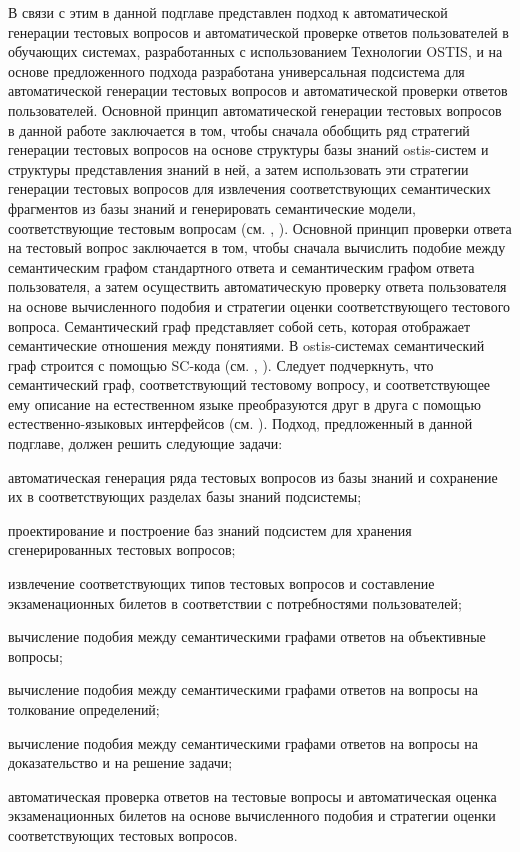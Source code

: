 В связи с этим в данной подглаве представлен подход к автоматической генерации тестовых вопросов и автоматической проверке ответов пользователей в обучающих системах, разработанных с использованием Технологии OSTIS, и на основе предложенного подхода разработана универсальная подсистема для автоматической генерации тестовых вопросов и автоматической проверки ответов пользователей. Основной принцип автоматической генерации тестовых вопросов в данной работе заключается в том, чтобы сначала обобщить ряд стратегий генерации тестовых вопросов на основе структуры базы знаний ostis-систем и структуры представления знаний в ней, а затем использовать эти стратегии генерации тестовых вопросов для извлечения соответствующих семантических фрагментов из базы знаний и генерировать семантические модели, соответствующие тестовым вопросам (см. , ). Основной принцип проверки ответа на тестовый вопрос заключается в том, чтобы сначала вычислить подобие между семантическим графом стандартного ответа и семантическим графом ответа пользователя, а затем осуществить автоматическую проверку ответа пользователя на основе вычисленного подобия и стратегии оценки соответствующего тестового вопроса. Семантический граф представляет собой сеть, которая отображает семантические отношения между понятиями. В ostis-системах семантический граф строится с помощью SC-кода (см. , ). Следует подчеркнуть, что семантический граф, соответствующий тестовому вопросу, и соответствующее ему описание на естественном языке преобразуются друг в друга с помощью естественно-языковых интерфейсов (см. ). Подход, предложенный в данной подглаве, должен решить следующие задачи:

\begin{textitemize}
	\item автоматическая генерация ряда тестовых вопросов из базы знаний и сохранение их в соответствующих разделах базы знаний подсистемы;
	\item проектирование и построение баз знаний подсистем для хранения сгенерированных тестовых вопросов;
	\item извлечение соответствующих типов тестовых вопросов и составление экзаменационных билетов в соответствии с потребностями пользователей;
	\item вычисление подобия между семантическими графами ответов на объективные вопросы;
	\item вычисление подобия между семантическими графами ответов на вопросы на толкование определений;
	\item вычисление подобия между семантическими графами ответов на вопросы на доказательство и на решение задачи;
	\item автоматическая проверка ответов на тестовые вопросы и автоматическая оценка экзаменационных билетов на основе вычисленного подобия и стратегии оценки соответствующих тестовых вопросов.
\end{textitemize}

